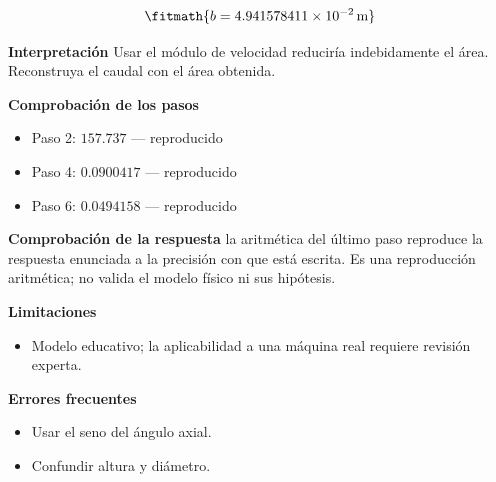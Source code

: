 \documentclass[10pt,openany]{book}
\begin{document}
\begin{tcolorbox}[title={Problema resuelto 4}, studiumworked, breakable]
\[
\fitmath{b=4.941578411\times10^{-2}\,\mathrm{m}}
\]

\noindent\textbf{Interpretación}
Usar el módulo de velocidad reduciría indebidamente el área. Reconstruya el caudal con el área obtenida.

\noindent\textbf{Comprobación de los pasos}
\begin{itemize}
\item Paso 2: $157.737$ — reproducido
\item Paso 4: $0.0900417$ — reproducido
\item Paso 6: $0.0494158$ — reproducido
\end{itemize}

\noindent\textbf{Comprobación de la respuesta} la aritmética del último paso reproduce la respuesta enunciada a la precisión con que está escrita. Es una reproducción aritmética; no valida el modelo físico ni sus hipótesis.

\noindent\textbf{Limitaciones}
\begin{itemize}
\item Modelo educativo; la aplicabilidad a una máquina real requiere revisión experta.
\end{itemize}

\noindent\textbf{Errores frecuentes}
\begin{itemize}
\item Usar el seno del ángulo axial.
\item Confundir altura y diámetro.
\end{itemize}
\end{tcolorbox}
\end{document}
